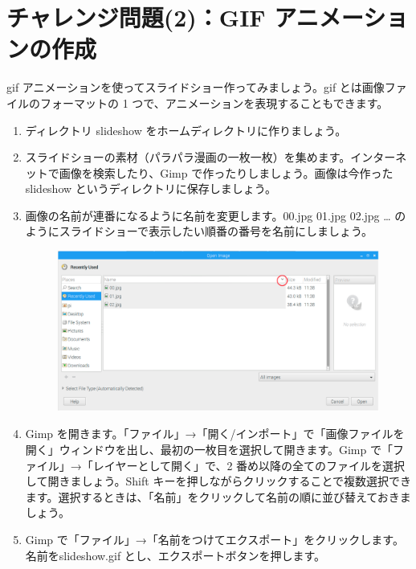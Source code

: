 \section{チャレンジ問題(2)：GIF アニメーションの作成}
\label{GIF}
gif アニメーションを使ってスライドショー作ってみましょう。gif とは画像ファイルのフォーマットの 1 つで、アニメーションを表現することもできます。\\
\begin{enumerate}
\item ディレクトリ slideshow をホームディレクトリに作りましょう。\\
\item スライドショーの素材（パラパラ漫画の一枚一枚）を集めます。インターネットで画像を検索したり、Gimp で作ったりしましょう。画像は今作った slideshow というディレクトリに保存しましょう。\\
\item 画像の名前が連番になるように名前を変更します。00.jpg 01.jpg 02.jpg … のようにスライドショーで表示したい順番の番号を名前にしましょう。\\
\begin{figure}[H]
    \centering
    \includegraphics[width=\linewidth]{images/chap03/text03-img025.png}
\end{figure}
\item Gimp を開きます。「ファイル」→「開く/インポート」で「画像ファイルを開く」ウィンドウを出し、最初の一枚目を選択して開きます。Gimp で「ファイル」→「レイヤーとして開く」で、2 番め以降の全てのファイルを選択して開きましょう。Shift キーを押しながらクリックすることで複数選択できます。選択するときは、「名前」をクリックして名前の順に並び替えておきましょう。\\
\item Gimp で「ファイル」→「名前をつけてエクスポート」をクリックします。名前をslideshow.gif とし、エクスポートボタンを押します。
\begin{figure}[H]

\end{figure}
\end{enumerate}
